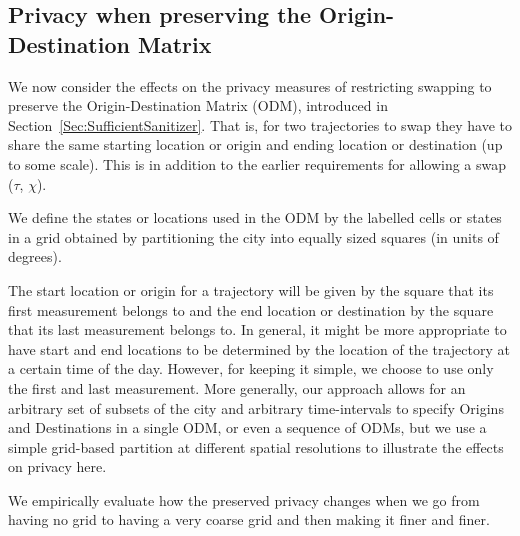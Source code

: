 \documentclass[times,twocolumn,final,authoryear]{elsarticle}
\begin{document}
\subsection{Privacy when preserving the Origin-Destination Matrix}\label{S:PrivacyODM}
We now consider the effects on the privacy measures of restricting 
swapping to preserve the Origin-Destination Matrix (ODM), introduced in Section~\ref{Sec:SufficientSanitizer}. That is, for two trajectories to
swap they have to share the same starting location or origin and ending location or destination (up to some scale).  
This is in addition to the earlier requirements for allowing a swap ($\tau$, $\chi$).

We define the states or locations used in the ODM by the labelled cells or states in a grid obtained by partitioning the
city into equally sized squares (in units of degrees).  

The start location or origin for a trajectory will be given by the square that its first
measurement belongs to and the end location or destination by the square that its last
measurement belongs to. 
In general, it might be more appropriate to
have start and end locations to be determined by the location of the
trajectory at a certain time of the day. 
However, for keeping it
simple, we choose to use only the first and last measurement.
More generally, our approach allows for an arbitrary set of subsets of the city and arbitrary time-intervals to specify Origins and Destinations in a single ODM, or even a sequence of ODMs, but we use a simple grid-based partition at different spatial resolutions to illustrate the effects on privacy here.  

We empirically evaluate how the preserved privacy changes when we go from having
no grid to having a very coarse grid and then making it finer and
finer.
\end{document}
